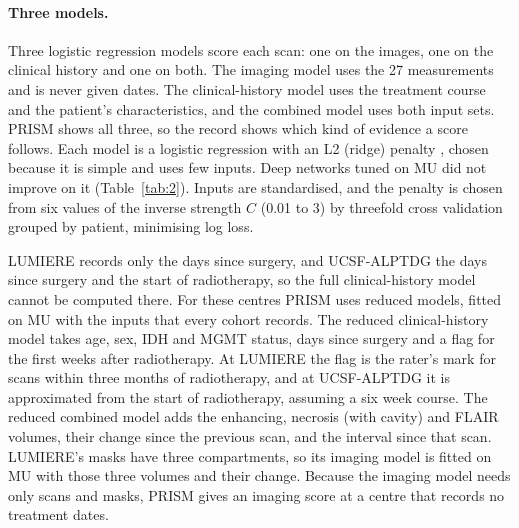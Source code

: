 \paragraph*{Three models.} Three logistic regression models score each scan: one on the images, one on the clinical
history and one on both. The imaging model uses the 27 measurements and is never given dates. The clinical-history
model uses the treatment course and the patient's characteristics, and the combined model uses both input sets.
PRISM shows all three, so the record shows which kind of evidence a score follows. Each model is a logistic regression
with an L2 (ridge) penalty \citep{pedregosa2011}, chosen because it is simple and uses few inputs. Deep networks tuned
on MU did not improve on it (Table~\ref{tab:2}). Inputs are standardised, and the penalty is chosen from six values of
the inverse strength $C$ (0.01 to 3) by threefold cross validation grouped by patient, minimising log loss.

LUMIERE records only the days since surgery, and UCSF-ALPTDG the days since surgery and the start of radiotherapy,
so the full
clinical-history model cannot be computed there. For these centres PRISM uses reduced models, fitted on MU with the
inputs that every cohort records. The reduced clinical-history model takes age, sex, IDH and MGMT status, days since
surgery and a flag for the first weeks after radiotherapy. At LUMIERE the flag is the rater's mark for scans within
three months of radiotherapy, and at UCSF-ALPTDG it is approximated from the start of radiotherapy, assuming a six
week course. The reduced combined model adds the enhancing, necrosis (with cavity) and FLAIR volumes, their change
since the previous scan, and the interval since that scan. LUMIERE's masks have three compartments, so its imaging
model is fitted on MU with those three volumes and their change. Because the imaging model needs only scans and masks,
PRISM gives an imaging score at a centre that records no treatment dates.

